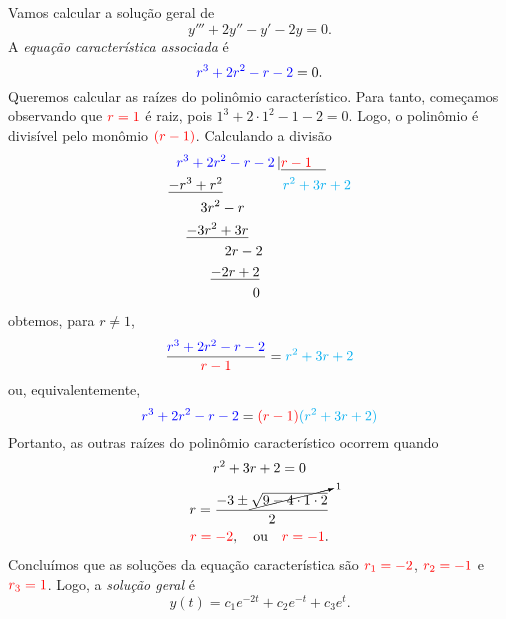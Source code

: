 \begin{ex}\label{ex:edolin_on_h}
  Vamos calcular a solução geral de
  \begin{equation}
    y''' + 2y'' - y' - 2y = 0.
  \end{equation}
  A \emph{equação característica associada} é
  \begin{equation}
    {\color{blue}r^3 + 2r^2 - r - 2} = 0.
  \end{equation}
  Queremos calcular as raízes do polinômio característico. Para tanto, começamos observando que ${\color{red}r=1}$ é raiz, pois $1^3+2\cdot 1^2 - 1 - 2 = 0$. Logo, o polinômio é divisível pelo monômio ${\color{red}(r-1)}$. Calculando a divisão
  \begin{align}
    &\;\;{\color{blue}r^3 + 2r^2 - r - 2} \,|\underline{{\color{red}r-1}\quad}\\
    &\underline{-r^3 + r^2}\quad\quad\quad\quad\;{\color{cyan}r^2+3r+2}\\
    &\quad\quad\; 3r^2 - r\\
    &\quad\; \underline{-3r^2 + 3r}\\
    &\quad\quad\quad\quad 2r - 2\\
    &\quad\quad\quad\underline{-2r + 2}\\
    &\quad\quad\quad\quad\quad\quad 0
  \end{align}
  obtemos, para $r\neq 1$,
  \begin{equation}
    \frac{{\color{blue}r^3 + 2r^2 - r - 2}}{{\color{red}r-1}} = {\color{cyan}r^2+3r+2}
  \end{equation}
  ou, equivalentemente,
  \begin{equation}
    {\color{blue}r^3 + 2r^2 - r - 2} = {\color{red}(r-1)}{\color{cyan}(r^2+3r+2)}
  \end{equation}
  Portanto, as outras raízes do polinômio característico ocorrem quando
  \begin{gather}
    r^2 + 3r + 2 = 0\\
    r = \frac{-3 \pm \cancelto{1}{\sqrt{9-4\cdot 1\cdot 2}}}{2}\\
    {\color{red}r = -2},\quad\text{ou}\quad {\color{red}r = -1}.
  \end{gather}
  Concluímos que as soluções da equação característica são ${\color{red}r_1 = -2}$, ${\color{red}r_2 = -1}$ e ${\color{red}r_3=1}$. Logo, a \emph{solução geral} é
  \begin{equation}
    y(t) = c_1e^{-2t} + c_2e^{-t} + c_3e^t.
  \end{equation}


\end{ex}
